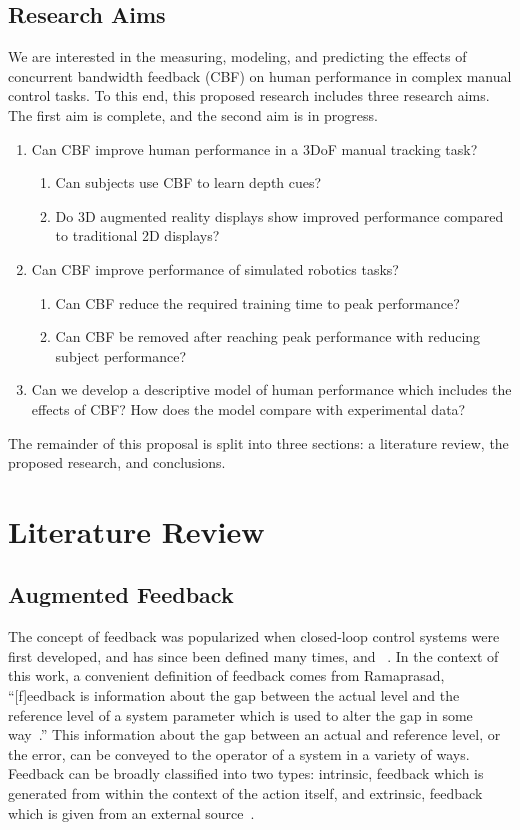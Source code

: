 \documentclass{paper}
\begin{document}

\subsection{Research Aims}
We are interested in the measuring, modeling, and predicting the effects of concurrent bandwidth feedback (CBF) on human performance in complex manual control tasks.
To this end, this proposed research includes three research aims.
The first aim is complete, and the second aim is in progress.
\begin{enumerate}
\item Can CBF improve human performance in a 3DoF manual tracking task?
\begin{enumerate}
\item Can subjects use CBF to learn depth cues?
\item Do 3D augmented reality displays show improved performance compared to traditional 2D displays?
\end{enumerate}
\item Can CBF improve performance of simulated robotics tasks?
\begin{enumerate}
\item Can CBF reduce the required training time to peak performance?
\item Can CBF be removed after reaching peak performance with reducing subject performance?
\end{enumerate}
\item Can we develop a descriptive model of human performance which includes the effects of CBF? How does the model compare with experimental data?
\end{enumerate}

The remainder of this proposal is split into three sections: a literature review, the proposed research, and conclusions.

\section{Literature Review}
\subsection{Augmented Feedback}
The concept of feedback was popularized when closed-loop control systems were first developed, and has since been defined many times, and ~\cite{Wierner1948}.
In the context of this work, a convenient definition of feedback comes from Ramaprasad, ``[f]eedback is information about the gap between the actual level and the reference level of a system parameter which is used to alter the gap in some way~\cite{Ramaprasad1983}.''
This information about the gap between an actual and reference level, or the error, can be conveyed to the operator of a system in a variety of ways.
Feedback can be broadly classified into two types: intrinsic, feedback which is generated from within the context of the action itself, and extrinsic, feedback which is given from an external source~\cite{laurillard1993rethinking}.
\end{document}
